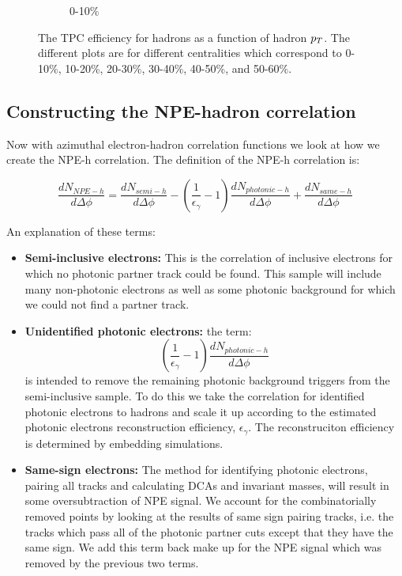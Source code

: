 \begin{figure}[htbp]
\begin{subfigure}{0.5\textwidth}
		\caption{0-10\%}
		\label{fig:assohefff}
	\end{subfigure}	
\caption[Associated hadron efficiency]{The TPC efficiency for hadrons as a function of hadron $p_{T}$. The different plots are for different centralities which correspond to 0-10\%, 10-20\%, 20-30\%, 30-40\%, 40-50\%, and 50-60\%.}
\label{fig:assoheff}
\end{figure}

\subsection{Constructing the NPE-hadron correlation}

Now with azimuthal electron-hadron correlation functions we look at how we create the NPE-h correlation. The definition of the NPE-h correlation is:

\begin{equation}\label{eq:NPEhdef}
 \frac{dN_{NPE-h}}{d\Delta\phi} = \frac{dN_{semi-h}}{d\Delta\phi} - \left(\frac{1}{\epsilon_{\gamma}} - 1\right)\frac{dN_{photonic-h}}{d\Delta\phi} + \frac{dN_{same-h}}{d\Delta\phi}   
\end{equation} 

An explanation of these terms:

\begin{itemize}
\item \textbf{Semi-inclusive electrons:} This is the correlation of inclusive electrons for which no photonic partner track could be found. This sample will include many non-photonic electrons as well as some photonic background for which we could not find a partner track. 
\item \textbf{Unidentified photonic electrons:} the term: \[ \left(\frac{1}{\epsilon_{\gamma}} - 1\right)\frac{dN_{photonic-h}}{d\Delta\phi} \] is intended to remove the remaining photonic background triggers from the semi-inclusive sample. To do this we take the correlation for identified photonic electrons to hadrons and scale it up according to the estimated photonic electrons reconstruction efficiency, $\epsilon_{\gamma}$. The reconstruciton efficiency is determined by embedding simulations.  
\item \textbf{Same-sign electrons:} The method for identifying photonic electrons, pairing all tracks and calculating DCAs and invariant masses, will result in some oversubtraction of NPE signal. We account for the combinatorially removed points by looking at the results of same sign pairing tracks, i.e. the tracks which pass all of the photonic partner cuts except that they have the same sign. We add this term back make up for the NPE signal which was removed by the previous two terms. 
\end{itemize}

